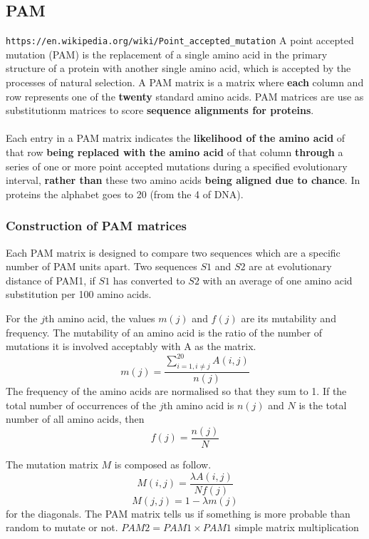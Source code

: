 \documentclass[11pt]{article}
\begin{document}
\subsection{PAM} %
\label{sub:pam}
\texttt{https://en.wikipedia.org/wiki/Point\_accepted\_mutation}
A point accepted mutation (PAM) is the replacement of a single amino acid in the primary structure of a protein with another single amino acid, which is accepted by the processes of natural selection.
A PAM matrix is a matrix where \textbf{each} column and row represents one of the \textbf{twenty} standard amino acids. PAM matrices are use as substitutionm matrices to score \textbf{sequence alignments for proteins}. 

\paragraph{} %
\label{par:}
Each entry in a PAM matrix indicates the \textbf{likelihood of the amino acid} of that row \textbf{being replaced with the amino acid} of that column \textbf{through} a series of one or more point accepted mutations during a specified evolutionary interval, \textbf{rather than} these two amino acids \textbf{being aligned due to chance}.
In proteins the alphabet goes to 20 (from the 4 of DNA).


\subsubsection{Construction of PAM matrices} %
\label{ssub:constructiono_of_pam_matrices}
Each PAM matrix is designed to compare two sequences which are a specific number of PAM units apart. Two sequences $S1$ and $S2$ are at evolutionary distance of PAM1, if $S1$ has converted to $S2$ with an average of one amino acid substitution per 100 amino acids.

For the $j$th amino acid, the values $m(j)$ and $f(j)$ are its mutability and frequency. The mutability of an amino acid is the ratio of the number of mutations it is involved acceptably with A as the matrix.
\[
	m(j) = \frac{\sum^{20}_{i=1, i \neq j} A(i,j)}{n(j)}
\] 
The frequency of the amino acids are normalised so that they sum to 1.
If the total number of occurrences of the $j$th amino acid is $n(j)$ and $N$ is the total number of all amino acids, then 
\[
	f(j) = \frac{n(j)}{N}
\]

The mutation matrix $M$ is composed as follow.
\[
	M(i,j) = \frac{\lambda A(i,j)}{N f(j)}
\]\[
	M(j,j) = 1 - \lambda m(j)
\] for the diagonals.
The PAM matrix tells us if something is more probable than random to mutate or not.
$PAM2 = PAM1 \times PAM1$ simple matrix multiplication
\end{document}
